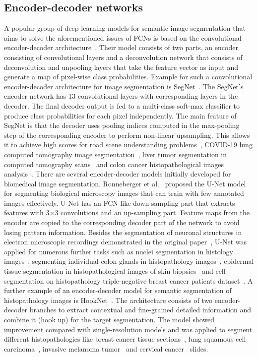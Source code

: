 \subsection{Encoder-decoder networks}
A popular group of deep learning models for semantic image segmentation that aims to solve the aforementioned issues of FCNs is based on the convolutional encoder-decoder architecture~\cite{noh2015learning}. Their model consists of two parts, an encoder consisting of convolutional layers and a deconvolution network that consists of deconvolution and unpooling layers that take the feature vector as input and generate a map of pixel-wise class probabilities. Example for such a convolutional encoder-decoder architecture for image segmentation is SegNet~\cite{badrinarayanan2017segnet}. The SegNet's encoder network has 13 convolutional layers with corresponding layers in the decoder. The final decoder output is fed to a multi-class soft-max classifier to produce class probabilities for each pixel independently. The main feature of SegNet is that the decoder uses pooling indices computed in the max-pooling step of the corresponding encoder to perform non-linear upsampling. This allows it to achieve high scores for road scene understanding problems~\cite{badrinarayanan2017segnet}, COVID-19 lung computed tomography image segmentation~\cite{saood2021covid}, liver tumor segmentation in computed tomography scans~\cite{almotairi2020liver} and colon cancer histopathological images analysis~\cite{hamida2021deep}. There are several encoder-decoder models initially developed for biomedical image segmentation. Ronneberger et al.~\cite{10.1007/978-3-319-24574-4_28} proposed the U-Net model for segmenting biological microscopy images that can train with few annotated images effectively. U-Net has an FCN-like down-sampling part that extracts features with 3$\times$3 convolutions and an up-sampling part. Feature maps from the encoder are copied to the corresponding decoder part of the network to avoid losing pattern information. Besides the segmentation of neuronal structures in electron microscopic recordings demonstrated in the original paper~\cite{10.1007/978-3-319-24574-4_28}, U-Net was applied for numerous further tasks such as nuclei segmentation in histology images~\cite{lagree2021review, zeng2019ric}, segmenting individual colon glands in histopathology images~\cite{pinckaers2019neural}, epidermal tissue segmentation in histopathological images of skin biopsies~\cite{oskal2019u} and cell segmentation on histopathology triple-negative breast cancer patients dataset~\cite{bagdigen2020cell}. A further example of an encoder-decoder model for semantic segmentation of histopathology images is HookNet~\cite{van2021hooknet}. The architecture consists of two encoder-decoder branches to extract contextual and fine-grained detailed information and combine it (hook up) for the target segmentation. The model showed improvement compared with single-resolution models and was applied to segment different histopathologies like breast cancer tissue sections~\cite{van2021hooknet}, lung squamous cell carcinoma~\cite{van2021hooknet}, invasive melanoma tumor~\cite{shahdeep} and cervical cancer~\cite{meng2021cervical} slides.

